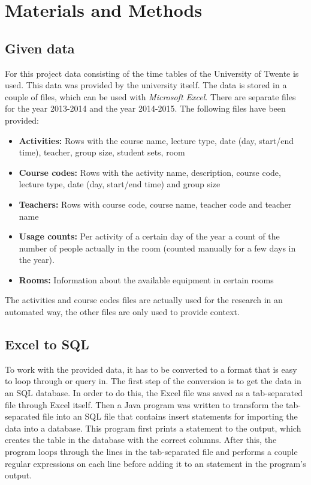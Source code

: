 \section{Materials and Methods}
\subsection{Given data}
For this project data consisting of the time tables of the University of Twente is used. This data was provided by the university itself. The data is stored in a couple of  files, which can be used with \emph{Microsoft Excel}. There are separate files for the year 2013-2014 and the year 2014-2015. The following files have been provided:

\begin{itemize}
	\item \textbf{Activities:} Rows with the course name, lecture type, date (day, start/end time), teacher, group size, student sets, room
	\item \textbf{Course codes:} Rows with the activity name, description, course code, lecture type, date (day, start/end time) and group size
	\item \textbf{Teachers:} Rows with course code, course name, teacher code and teacher name
	\item \textbf{Usage counts:} Per activity of a certain day of the year a count of the number of people actually in the room (counted manually for a few days in the year).
	\item\textbf{Rooms:} Information about the available equipment in certain rooms
\end{itemize}

The activities and course codes files are actually used for the research in an automated way, the other files are only used to provide context.

\subsection{Excel to SQL}
To work with the provided data, it has to be converted to a format that is easy to loop through or query in. The first step of the conversion is to get the data in an SQL database. In order to do this, the Excel file was saved as a tab-separated file through Excel itself. Then a Java program was written to transform the tab-separated file into an SQL file that contains insert statements for importing the data into a database. This program first prints a  statement to the output, which creates the table in the database with the correct columns. After this, the program loops through the lines in the tab-separated file and performs a couple regular expressions on each line before adding it to an  statement in the program's output.

